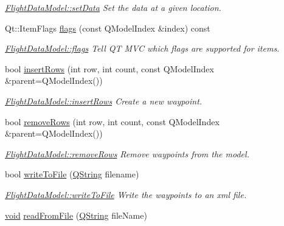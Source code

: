 \begin{DoxyCompactItemize}
\begin{DoxyCompactList}\small\item\em \hyperlink{group___path_ga8931eaae5c2004c4d42233bcdad3ee4d}{\-Flight\-Data\-Model\-::set\-Data} \-Set the data at a given location. \end{DoxyCompactList}\item 
\-Qt\-::\-Item\-Flags \hyperlink{group___path_gaeabf907ec7c9cfc6c410c2dd6678e603}{flags} (const \-Q\-Model\-Index \&index) const 
\begin{DoxyCompactList}\small\item\em \hyperlink{group___path_gaeabf907ec7c9cfc6c410c2dd6678e603}{\-Flight\-Data\-Model\-::flags} \-Tell \-Q\-T \-M\-V\-C which flags are supported for items. \end{DoxyCompactList}\item 
bool \hyperlink{group___path_ga17a5cd58322554d7fadb0c84031deb26}{insert\-Rows} (int row, int count, const \-Q\-Model\-Index \&parent=\-Q\-Model\-Index())
\begin{DoxyCompactList}\small\item\em \hyperlink{group___path_ga17a5cd58322554d7fadb0c84031deb26}{\-Flight\-Data\-Model\-::insert\-Rows} \-Create a new waypoint. \end{DoxyCompactList}\item 
bool \hyperlink{group___path_ga951208986321a56cc67eafa5a9d67f0e}{remove\-Rows} (int row, int count, const \-Q\-Model\-Index \&parent=\-Q\-Model\-Index())
\begin{DoxyCompactList}\small\item\em \hyperlink{group___path_ga951208986321a56cc67eafa5a9d67f0e}{\-Flight\-Data\-Model\-::remove\-Rows} \-Remove waypoints from the model. \end{DoxyCompactList}\item 
bool \hyperlink{group___path_gae8b76411094a9ad3164eab0996436da6}{write\-To\-File} (\hyperlink{group___u_a_v_objects_plugin_gab9d252f49c333c94a72f97ce3105a32d}{\-Q\-String} filename)
\begin{DoxyCompactList}\small\item\em \hyperlink{group___path_gae8b76411094a9ad3164eab0996436da6}{\-Flight\-Data\-Model\-::write\-To\-File} \-Write the waypoints to an xml file. \end{DoxyCompactList}\item 
\hyperlink{group___u_a_v_objects_plugin_ga444cf2ff3f0ecbe028adce838d373f5c}{void} \hyperlink{group___path_ga39997b5fd9d9720f2798e2c1a18b8171}{read\-From\-File} (\hyperlink{group___u_a_v_objects_plugin_gab9d252f49c333c94a72f97ce3105a32d}{\-Q\-String} file\-Name)

\end{DoxyCompactItemize}

